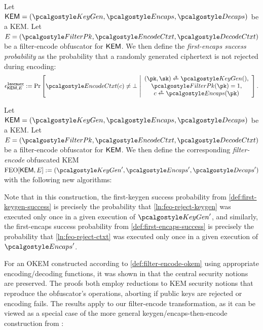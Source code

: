 \begin{definition}
\label{def:first-encaps-success}
    Let $\KEM = (\kgen, \encaps, \decaps)$ be a KEM.
    Let $E = (\filterpk, \encodectxt, \decodectxt)$ be a filter-encode obfuscator for $\mathsf{KEM}$.
    We then define the \emph{first-encaps success probability} as the probability that a randomly generated ciphertext is not rejected during encoding:
    \[
        \epsilon^\firstencapssuccess_{\KEM,E} :=
        \Pr\left[
            \encodectxt(c) \neq \bot
        ~\middle|
            \begin{array}{c}
                (\pk, \sk) \getsr \kgen(), \\
                \filterpk(\pk) = 1, \\
                c \getsr \encaps(\pk)
            \end{array}
        \right].
    \]
\end{definition}

\begin{definition}
\label{def:filter-encode-okem}
    Let $\KEM = (\kgen, \encaps, \decaps)$ be a KEM.
    Let $E = (\filterpk, \encodectxt, \decodectxt)$ be a filter-encode obfuscator for $\mathsf{KEM}$.
    We then define the corresponding \emph{filter-encode} obfuscated KEM $\feo[\KEM, E] := (\kgen', \encaps', \decaps')$ with the following new algorithms:

    
\end{definition}

Note that in this construction, the first-keygen success probability from \cref{def:first-keygen-success} is precisely the probability that \cref{ln:feo-reject-keygen} was executed only once in a given execution of $\kgen'$, and similarly, the first-encaps success probability from \cref{def:first-encaps-success} is precisely the probability that \cref{ln:feo-reject-ctxt} was executed only once in a given execution of $\encaps'$.

For an OKEM constructed according to \cref{def:filter-encode-okem} using appropriate encoding/decoding functions, it was shown in \cite[Theorems 2.12 and 2.13]{CCS:GunSteVei24} that the central security notions are preserved. The proofs both employ reductions to KEM security notions that reproduce the obfuscator's operations, aborting if public keys are rejected or encoding fails.
The results apply to our filter-encode transformation, as it can be viewed as a special case of the more general keygen/encaps-then-encode construction from \cite{CCS:GunSteVei24}:

